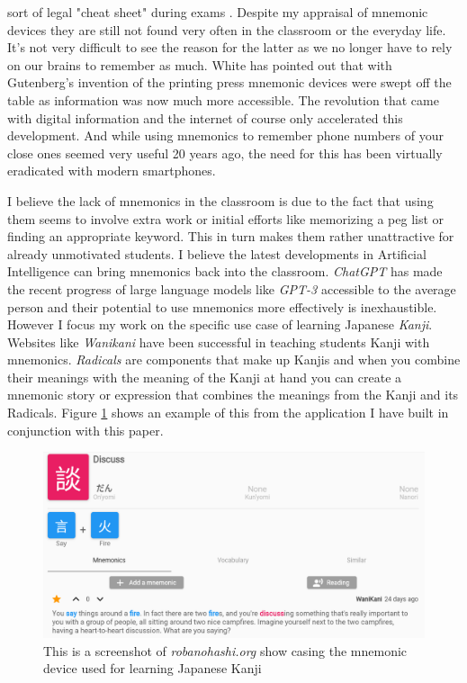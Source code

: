 sort of legal "cheat sheet" during exams \cite{putnam_2015}. Despite my appraisal of mnemonic devices they are still not found very often in the classroom or the everyday life. It's not very difficult to see the reason for the latter as we no longer have to rely on our brains to remember as much. White has pointed out that with Gutenberg's invention of the printing press mnemonic devices were swept off the table as information was now much more accessible. \cite{white_2014} The revolution that came with digital information and the internet of course only accelerated this development. And while using mnemonics to remember phone numbers of your close ones seemed very useful 20 years ago, the need for this has been virtually eradicated with modern smartphones.

I believe the lack of mnemonics in the classroom is due to the fact that using them seems to involve extra work or initial efforts like memorizing a peg list or finding an appropriate keyword. This in turn makes them rather unattractive for already unmotivated students.
I believe the latest developments in Artificial Intelligence can bring mnemonics back into the classroom. \emph{ChatGPT} has made the recent progress of large language models like \emph{GPT-3} accessible to the average person and their potential to use mnemonics more effectively is inexhaustible. However I focus my work on the specific use case of learning Japanese \emph{Kanji}. Websites like \emph{Wanikani} \cite{wanikani} have been successful in teaching students Kanji with mnemonics. \emph{Radicals} are components that make up Kanjis and when you combine their meanings with the meaning of the Kanji at hand you can create a mnemonic story or expression that combines the meanings from the Kanji and its Radicals. Figure \ref{figure:robanohashi_example} shows an example of this from the application I have built in conjunction with this paper.
\begin{figure}
    \centering
    \includegraphics[width=400pt]{resources/robanohashi_example.png}
    \caption{This is a screenshot of \emph{robanohashi.org} show casing the mnemonic device used for learning Japanese Kanji}
    \label{figure:robanohashi_example}
\end{figure}
